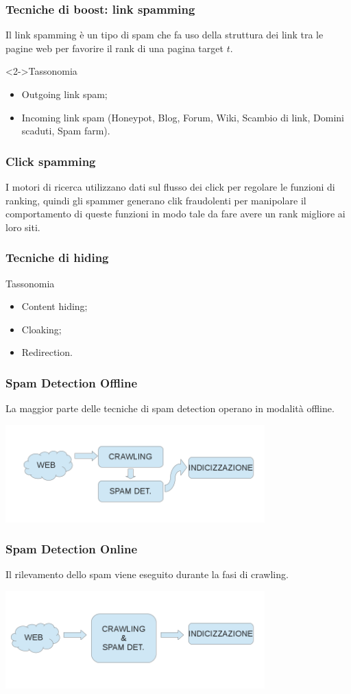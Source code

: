 \documentclass{beamer}
\begin{document}
\begin{frame}
    \frametitle{Tecniche di boost: link spamming}
    Il link spamming è un tipo di spam che fa uso della struttura dei link tra le pagine web per favorire il rank di una pagina target \(t\). 
    \begin{block}<2->{Tassonomia}
    \begin{itemize}
    \item<2->Outgoing link spam;
    \item<2->Incoming link spam (Honeypot, Blog, Forum, Wiki, Scambio di link, Domini scaduti, Spam farm).
    \end{itemize}
    \end{block}
\end{frame}
\begin{frame}
    \frametitle{Click spamming}
I motori di ricerca utilizzano dati sul flusso dei click per regolare le funzioni di ranking, quindi gli spammer generano clik fraudolenti per manipolare il comportamento di queste funzioni in modo tale da fare avere un rank migliore ai loro siti. 
\end{frame}
\begin{frame}
    \frametitle{Tecniche di hiding}
    \begin{block}{Tassonomia}
    \begin{itemize}
    \item Content hiding;
    \item Cloaking;
    \item Redirection.
    \end{itemize}
    \end{block}
\end{frame}
\begin{frame}
    \frametitle{Spam Detection Offline}
    La maggior parte delle tecniche di spam detection operano in modalità offline.
  \begin{center}
   \includegraphics[width=10cm]{immagini/fasiSpam1}
  \end{center}
\end{frame}
\begin{frame}
    \frametitle{Spam Detection Online}
    Il rilevamento dello spam viene eseguito durante la fasi di crawling.
  \begin{center}
   \includegraphics[width=10cm]{immagini/fasiSpam2}
  \end{center}
\end{frame}
\end{document}
